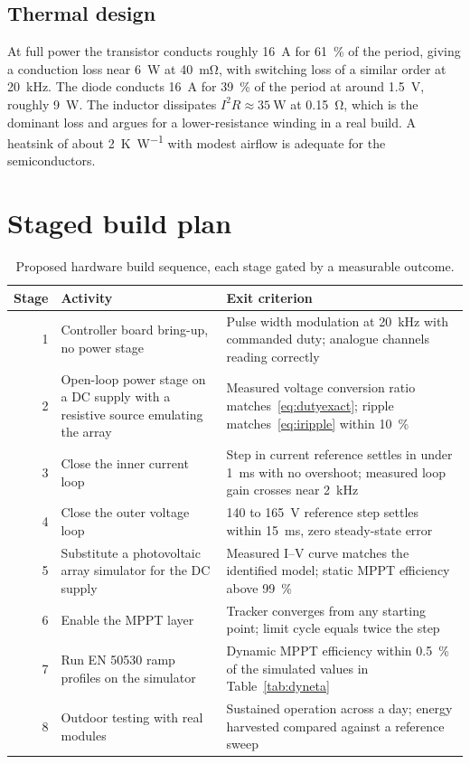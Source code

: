 \subsection{Thermal design}

At full power the transistor conducts roughly \SI{16}{\ampere} for
\SI{61}{\percent} of the period, giving a conduction loss near \SI{6}{\watt} at
\SI{40}{\milli\ohm}, with switching loss of a similar order at
\SI{20}{\kilo\hertz}. The diode conducts \SI{16}{\ampere} for \SI{39}{\percent}
of the period at around \SI{1.5}{\volt}, roughly \SI{9}{\watt}. The inductor
dissipates $I^2 R \approx \SI{35}{\watt}$ at \SI{0.15}{\ohm}, which is the
dominant loss and argues for a lower-resistance winding in a real build. A
heatsink of about \SI{2}{\kelvin\per\watt} with modest airflow is adequate for
the semiconductors.

\section{Staged build plan}

\begin{table}[htbp]
\centering
\caption{Proposed hardware build sequence, each stage gated by a measurable outcome.}
\label{tab:buildplan}
\begin{tabular}{@{}rp{}p{}@{}}
\toprule
\textbf{Stage} & \textbf{Activity} & \textbf{Exit criterion} \\
\midrule
1 & Controller board bring-up, no power stage & Pulse width modulation at \SI{20}{\kilo\hertz} with commanded duty; analogue channels reading correctly \\
2 & Open-loop power stage on a DC supply with a resistive source emulating the array & Measured voltage conversion ratio matches~\eqref{eq:dutyexact}; ripple matches~\eqref{eq:iripple} within \SI{10}{\percent} \\
3 & Close the inner current loop & Step in current reference settles in under \SI{1}{\milli\second} with no overshoot; measured loop gain crosses near \SI{2}{\kilo\hertz} \\
4 & Close the outer voltage loop & \SI{140}{} to \SI{165}{\volt} reference step settles within \SI{15}{\milli\second}, zero steady-state error \\
5 & Substitute a photovoltaic array simulator for the DC supply & Measured I--V curve matches the identified model; static MPPT efficiency above \SI{99}{\percent} \\
6 & Enable the MPPT layer & Tracker converges from any starting point; limit cycle equals twice the step \\
7 & Run EN 50530 ramp profiles on the simulator & Dynamic MPPT efficiency within \SI{0.5}{\percent} of the simulated values in Table~\ref{tab:dyneta} \\
8 & Outdoor testing with real modules & Sustained operation across a day; energy harvested compared against a reference sweep \\
\bottomrule
\end{tabular}
\end{table}

